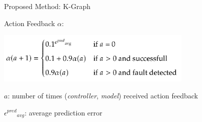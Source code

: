 \begin{frame}[fragile]{Proposed Method: K-Graph}

  Action Feedback $\alpha$:\bs

  \includegraphics[width=0.7\textwidth]{figures/proposed_method/successfactor}

 $a$: number of times (\textit{controller}, \textit{model}) received action feedback\bs

 ${\epsilon^\mathit{pred}}_{avg}$: average prediction error\bs
\end{frame}

